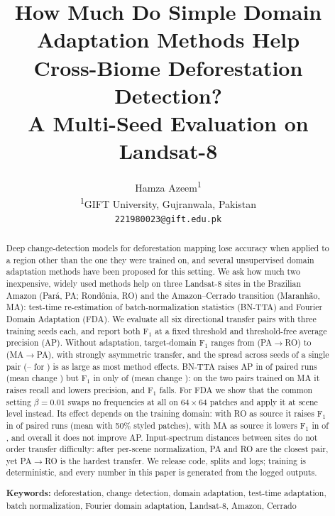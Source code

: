 \documentclass[11pt]{article}
\title{How Much Do Simple Domain Adaptation Methods Help\\Cross-Biome Deforestation Detection?\\
A Multi-Seed Evaluation on Landsat-8}
\author{
Hamza Azeem\textsuperscript{1}
\\[4pt]
\textsuperscript{1}GIFT University, Gujranwala, Pakistan\\
\texttt{221980023@gift.edu.pk}
}
\date{}
\newcommand{\BNTTA}{BN-TTA}
\newcommand{\Fone}{F$_1$}
\newcommand{\pr}[2]{#1$\to$#2}
\begin{document}
\maketitle

\begin{abstract}
Deep change-detection models for deforestation mapping lose accuracy when applied to a region other than the one they were trained on, and several unsupervised domain adaptation methods have been proposed for this setting.
We ask how much two inexpensive, widely used methods help on three Landsat-8 sites in the Brazilian Amazon (Par\'a, PA; Rond\^onia, RO) and the Amazon--Cerrado transition (Maranh\~ao, MA): test-time re-estimation of batch-normalization statistics (\BNTTA{}) and Fourier Domain Adaptation (FDA).
We evaluate all six directional transfer pairs with three training seeds each, and report both \Fone{} at a fixed threshold and threshold-free average precision (AP).
Without adaptation, target-domain \Fone{} ranges from \SOMin{} (\pr{PA}{RO}) to \SOMax{} (\pr{MA}{PA}), with strongly asymmetric transfer, and the spread across seeds of a single pair (\SOWidestLo{}--\SOWidestHi{} for \SOWidestPair{}) is as large as most method effects.
\BNTTA{} raises AP in \TTAAPAllW{} of \TTAAPAllN{} paired runs (mean change \TTAAPAllD{}) but \Fone{} in only \TTAAllW{} of \TTAAllN{} (mean change \TTAAllD{}): on the two pairs trained on MA it raises recall and lowers precision, and \Fone{} falls.
For FDA we show that the common setting $\beta = 0.01$ swaps no frequencies at all on $64\times64$ patches and apply it at scene level instead. Its effect depends on the training domain: with RO as source it raises \Fone{} in \MIXSrcROW{} of \MIXSrcRON{} paired runs (mean \MIXSrcROD{} with 50\% styled patches), with MA as source it lowers \Fone{} in \MIXSrcMAL{} of \MIXSrcMAN{}, and overall it does not improve AP.
Input-spectrum distances between sites do not order transfer difficulty: after per-scene normalization, PA and RO are the closest pair, yet \pr{PA}{RO} is the hardest transfer.
We release code, splits and logs; training is deterministic, and every number in this paper is generated from the logged outputs.

\smallskip
\noindent\textbf{Keywords:} deforestation, change detection, domain adaptation, test-time adaptation, batch normalization, Fourier domain adaptation, Landsat-8, Amazon, Cerrado
\end{abstract}

\end{document}
